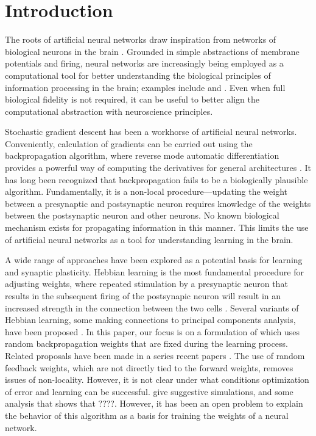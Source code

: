 \section{Introduction}

The roots of artificial neural networks draw inspiration from networks of biological neurons in the brain \citep{pdp,pinker,elman,medler}. Grounded in simple abstractions of membrane potentials and firing, neural networks are increasingly being employed as a computational tool for better understanding the biological principles of information processing in the brain; examples include \cite{ilker1} and \cite{yamins2}. Even when full biological fidelity is not required, it can be useful to better align the computational abstraction with neuroscience principles.

Stochastic gradient descent has been a workhorse of artificial neural networks. Conveniently, calculation of gradients can be carried out using the backpropagation algorithm, where reverse mode automatic differentiation provides a powerful way of computing the derivatives for general architectures \citep{rumelhart:86}.
It has long been recognized that backpropagation fails to be a biologically plausible algorithm. Fundamentally, it is a non-local procedure---updating the weight between a presynaptic and postsynaptic neuron requires knowledge of the weights between the postsynaptic neuron and other neurons. No known biological mechanism exists for propagating information in this manner. This limits the use of artificial neural networks as a tool for understanding learning in the brain.

A wide range of approaches have been explored as a potential basis for learning and synaptic plasticity. Hebbian learning is the most fundamental procedure for adjusting weights, where
repeated stimulation by a presynaptic neuron that results in the subsequent
firing of the postsynapic neuron will result in an increased strength in the connection
between the two cells \citep{hebb1,paulsen}. Several variants of Hebbian learning, some making connections to principal components analysis, have been proposed
\citep{oja,sejnowski1,sejnowski2}. In this paper, our focus  is on a formulation of \cite{lillicrap2016random} which uses random
backpropagation weights that are fixed during the learning process.
Related proposals have been made in a series recent papers \citep{akrout,bellec,lillicrap2020backpropagation}.
The use of random feedback weights, which are not directly tied to the forward weights, removes issues of non-locality. However, it is not clear under what conditions optimization of error and learning can be successful. \citet{lillicrap2016random} give suggestive simulations, and some analysis that shows that ????. However, it has been an open problem to explain the behavior of this algorithm as a basis for training the weights of a neural network.

